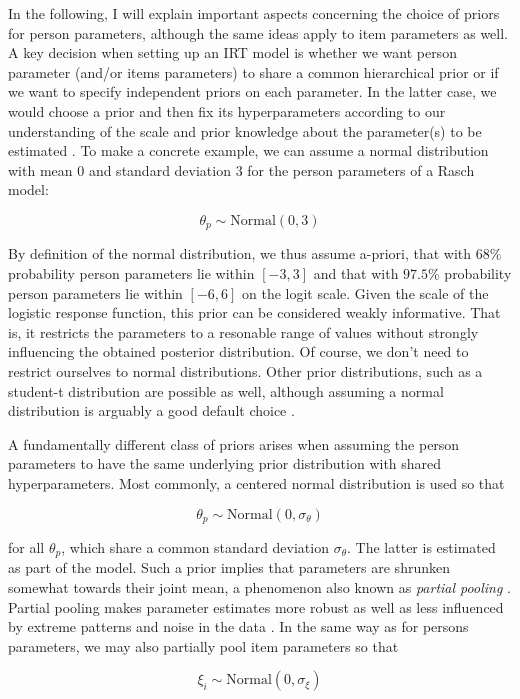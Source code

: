 \documentclass[jss]{jss}
\begin{document}
In the following, I will explain important aspects concerning the choice
of priors for person parameters, although the same ideas apply to item
parameters as well. A key decision when setting up an IRT model is
whether we want person parameter (and/or items parameters) to share a
common hierarchical prior or if we want to specify independent priors on
each parameter. In the latter case, we would choose a prior and then fix
its hyperparameters according to our understanding of the scale and
prior knowledge about the parameter(s) to be estimated
\citep{gelman2013}. To make a concrete example, we can assume a normal
distribution with mean \(0\) and standard deviation \(3\) for the person
parameters of a Rasch model:

\[
\theta_p \sim \text{Normal}(0, 3)
\]

By definition of the normal distribution, we thus assume a-priori, that
with \(68\%\) probability person parameters lie within \([-3, 3]\) and
that with \(97.5\%\) probability person parameters lie within
\([-6, 6]\) on the logit scale. Given the scale of the logistic response
function, this prior can be considered weakly informative. That is, it
restricts the parameters to a resonable range of values without strongly
influencing the obtained posterior distribution. Of course, we don't
need to restrict ourselves to normal distributions. Other prior
distributions, such as a student-t distribution are possible as well,
although assuming a normal distribution is arguably a good default
choice \citep[see also][]{mcelreath2017}.

A fundamentally different class of priors arises when assuming the
person parameters to have the same underlying prior distribution with
shared hyperparameters. Most commonly, a centered normal distribution is
used so that

\[
\theta_p \sim \text{Normal}(0, \sigma_\theta)
\]

for all \(\theta_p\), which share a common standard deviation
\(\sigma_\theta\). The latter is estimated as part of the model. Such a
prior implies that parameters are shrunken somewhat towards their joint
mean, a phenomenon also known as \emph{partial pooling}
\citep{gelmanMLM2006}. Partial pooling makes parameter estimates more
robust as well as less influenced by extreme patterns and noise in the
data \citep{gelmanMLM2006}. In the same way as for persons parameters,
we may also partially pool item parameters so that

\[
\xi_i \sim \text{Normal}(0, \sigma_\xi)
\]
\end{document}
